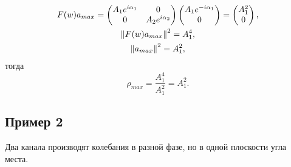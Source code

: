 \begin{gather*}
    F(w) a_{max}
    = \begin{pmatrix}
          A_1 e^{i \alpha_1} & 0 \\
          0                  & A_2 e^{i \alpha_2}
    \end{pmatrix}
    \begin{pmatrix}
        A_1 e^{- i \alpha_1} \\
        0
    \end{pmatrix}
    = \begin{pmatrix}
          A_1^2 \\
          0
    \end{pmatrix} , \\
    \left \| F(w) a_{max} \right \|^2 = A_1^4 , \\
    \left \| a_{max} \right \|^2 = A_1^2 ,
\end{gather*}
тогда
\[
    \rho_{max}
    = \frac{A_1^4}{A_1^2}
    = A_1^2 .
\]

\subsection{Пример 2}

Два канала производят колебания в разной фазе, но в одной плоскости угла места.

